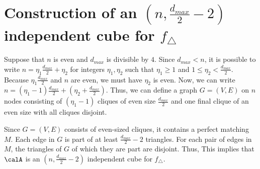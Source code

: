 
\section{Construction of an $(n, \frac{d_{max}}{2}-2)$ independent cube for $f_\triangle$}
\label{chap1-sub:cube_triangle}
Suppose that $n$ is even and $d_{max}$ is divisible by $4$.
Since $d_{max} < n$, it is possible to write 
$n = \eta_1 \frac{d_{max}}{2} + \eta_2$ 
for integers 
$\eta_1, \eta_2$
such that 
$\eta_1 \geq 1$ and $1 \leq \eta_2 < \frac{d_{max}}{2}$. 
Because 
$\eta_1 \frac{d_{max}}{2}$ 
and $n$ are even, 
we must have 
$\eta_2$ 
is even.
Now, we can write 
$n = (\eta_1-1) \frac{d_{max}}{2} + (\eta_2 + \frac{d_{max}}{2})$.
Thus, 
we can define 
a graph $G=(V,E)$ on $n$ 
nodes 
consisting of 
$(\eta_1-1)$ 
cliques of 
even 
size
$\frac{d_{max}}{2}$ and one final clique of an even size  
with all cliques disjoint. 

Since $G=(V,E)$ consists of even-sized cliques, it contains a perfect matching $M$. 
Each edge in $G$ is part of at least $\frac{d_{max}}{2}-2$ triangles. 
For each pair of edges in $M$, the triangles of $G$ of which they are part
are disjoint. 
Thus, 
 This implies 
that $\calA$ 
is an $(n,\frac{d_{max}}{2}-2)$ independent cube for $f_\triangle$.

